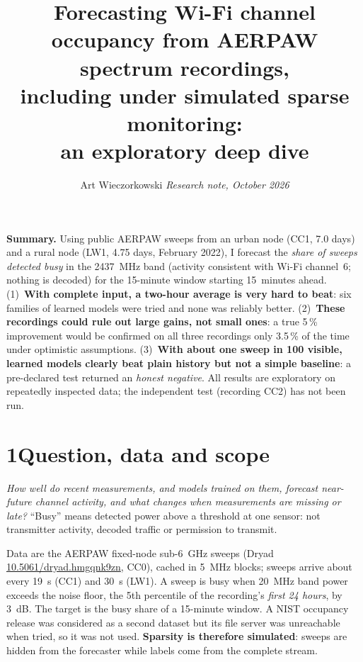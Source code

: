 \documentclass[10pt,a4paper]{article}
\title{\vspace{-1.2em}\textbf{Forecasting Wi-Fi channel occupancy from AERPAW spectrum recordings,\\
including under simulated sparse monitoring:\\ an exploratory deep dive}\vspace{-0.4em}}
\author{Art Wieczorkowski \quad\textit{Research note, October 2026}}
\date{}
\begin{document}
\maketitle
\vspace{-1.6em}

\textbf{Summary.} Using public AERPAW sweeps from an urban node (CC1, 7.0 days) and a rural node (LW1, 4.75 days,
February 2022), I forecast the \emph{share of sweeps detected busy} in the 2437~MHz band (activity consistent with
Wi-Fi channel~6; nothing is decoded) for the 15-minute window starting 15~minutes ahead.
(1)~\textbf{With complete input, a two-hour average is very hard to beat}: six families of learned models were
tried and none was reliably better. (2)~\textbf{These recordings could rule out large gains, not small ones}: a true
5\,\% improvement would be confirmed on all three recordings only 3.5\,\% of the time under optimistic assumptions.
(3)~\textbf{With about one sweep in 100 visible, learned models clearly beat plain history but not a simple
baseline}: a pre-declared test returned an \emph{honest negative}. All results are exploratory on repeatedly inspected data;
the independent test (recording CC2) has not been run.

\section*{1\quad Question, data and scope}
\textit{How well do recent measurements, and models trained on them, forecast near-future channel activity, and what
changes when measurements are missing or late?} ``Busy'' means detected power above a threshold at one sensor: not
transmitter activity, decoded traffic or permission to transmit.

Data are the AERPAW fixed-node sub-6~GHz sweeps (Dryad \href{https://doi.org/10.5061/dryad.hmgqnk9zn}{10.5061/dryad.hmgqnk9zn},
CC0), cached in 5~MHz blocks; sweeps arrive about every 19~s (CC1) and 30~s (LW1). A sweep is busy when 20~MHz band power exceeds the
noise floor, the 5th percentile of the recording's \emph{first 24 hours}, by 3~dB. The target is the busy share of
a 15-minute window. A NIST occupancy release was considered as a second dataset but its file server was unreachable when
tried, so it was not used. \textbf{Sparsity is therefore simulated}: sweeps are hidden from the forecaster while labels come from the
complete stream.
\end{document}
